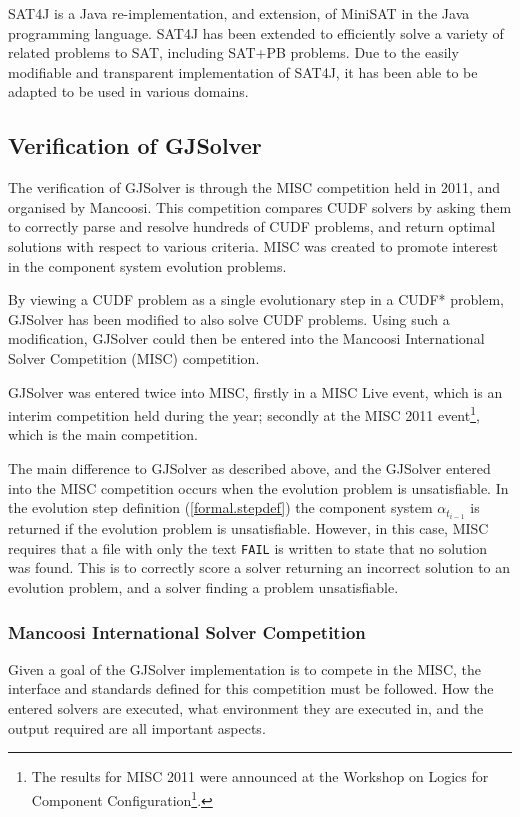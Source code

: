 SAT4J \citep{le2010sat4j} is a Java re-implementation, and extension, of MiniSAT in the Java programming language.
SAT4J has been extended to efficiently solve a variety of related problems to SAT, including SAT+PB problems.
Due to the easily modifiable and transparent implementation of SAT4J, it has been able to be adapted to be used in various domains.

\subsection{Verification of GJSolver}
\label{impl.verif}
The verification of GJSolver is through the MISC competition held in 2011, and organised by Mancoosi.
This competition compares CUDF solvers by asking them to correctly parse and resolve hundreds of CUDF problems, and return optimal solutions with respect to various criteria.
MISC was created to promote interest in the component system evolution problems.

By viewing a CUDF problem as a single evolutionary step in a CUDF* problem, GJSolver has been modified to also solve CUDF problems.
Using such a modification, GJSolver could then be entered into the Mancoosi International Solver Competition (MISC) competition.

GJSolver was entered twice into MISC, firstly in a MISC Live event, which is an interim competition held during the year;
secondly at the MISC 2011 event\footnote{The results for MISC 2011 were announced at the Workshop on Logics for Component Configuration\footnote{http://www.pps.jussieu.fr/~treinen/lococo/2011/ accessed 6/3/2012}.}, 
which is the main competition. 

The main difference to GJSolver as described above, and the GJSolver entered into the MISC competition occurs when the evolution problem is unsatisfiable.
In the evolution step definition (\ref{formal.stepdef}) the component system $\alpha_{t_{i-1}}$ is returned if the evolution problem is unsatisfiable.
However, in this case, MISC requires that a file with only the text \texttt{FAIL} is written to state that no solution was found.
This is to correctly score a solver returning an incorrect solution to an evolution problem, 
and a solver finding a problem unsatisfiable.

\subsubsection{Mancoosi International Solver Competition}
\label{impl.MISCDEF}
Given a goal of the GJSolver implementation is to compete in the MISC, the interface and standards defined for this competition must be followed.
How the entered solvers are executed, what environment they are executed in, and the output required are all important aspects.

